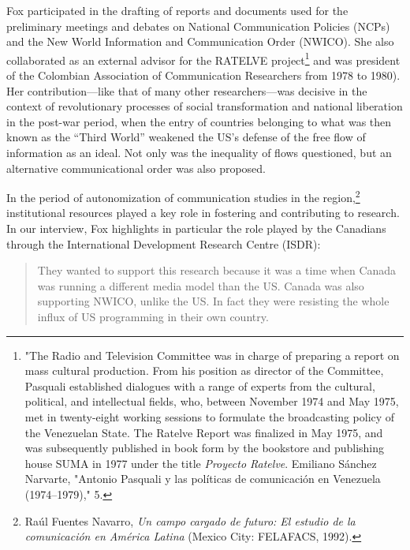 \documentclass{tufte-handout}
\begin{document}
\newpage Fox participated in the drafting of reports and documents used for the
preliminary meetings and debates on National Communication Policies
(NCPs) and the New World Information and Communication Order (NWICO).
She also collaborated as an external advisor for the RATELVE
project\footnote{"The Radio and Television Committee was in charge of
  preparing a report on mass cultural production. From his position as
  director of the Committee, Pasquali established dialogues with a range
  of experts from the cultural, political, and intellectual fields, who,
  between November 1974 and May 1975, met in twenty-eight working
  sessions to formulate the broadcasting policy of the Venezuelan State.
  The Ratelve Report was finalized in May 1975, and was subsequently
  published in book form by the bookstore and publishing house SUMA in
  1977 under the title \emph{Proyecto Ratelve}. Emiliano Sánchez
  Narvarte, "Antonio Pasquali y las políticas de comunicación en
  Venezuela (1974--1979)," 5.} and was president of the Colombian
Association of Communication Researchers from 1978 to 1980). Her
contribution---like that of many other researchers---was decisive in the
context of revolutionary processes of social transformation and national
liberation in the post-war period, when the entry of countries belonging
to what was then known as the ``Third World'' weakened the US's defense
of the free flow of information as an ideal. Not only was the inequality
of flows questioned, but an alternative communicational order was also
proposed.

In the period of autonomization of communication studies in the
region,\footnote{Raúl Fuentes Navarro, \emph{Un campo cargado de futuro:
  El estudio de la comunicación en América Latina} (Mexico City:
  FELAFACS, 1992).} institutional resources played a key role in
fostering and contributing to research. In our interview, Fox highlights
in particular the role played by the Canadians through the International
Development Research Centre (ISDR):

\begin{quote}
They wanted to support this research because it was a time when Canada
was running a different media model than the US. Canada was also
supporting NWICO, unlike the US. In fact they were resisting the whole
influx of US programming in their own country.
\end{quote}
\end{document}
